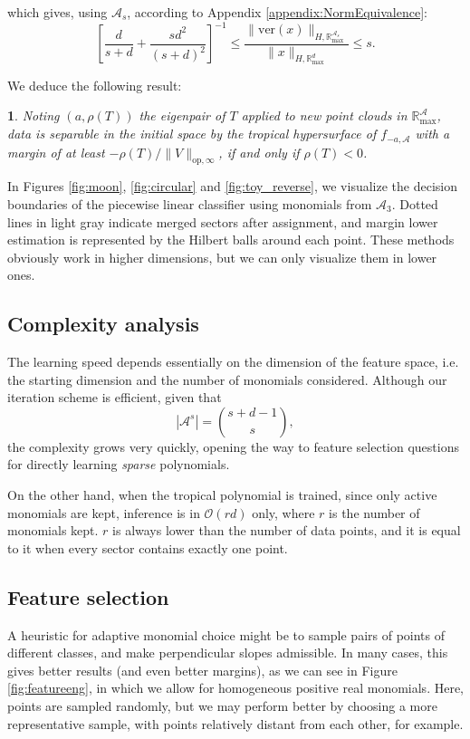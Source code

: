 \documentclass[oneside,UKenglish,a4paper]{amsart}
\numberwithin{equation}{section}
\numberwithin{figure}{section}
\theoremstyle{plain}
\theoremstyle{definition}
\theoremstyle{plain}
\newtheorem{prop}[thm]{\protect\propositionname}
\theoremstyle{remark}
\theoremstyle{plain}
\theoremstyle{definition}
\theoremstyle{definition}
\providecommand{\propositionname}{Proposition}
\begin{document}
which gives, using $\mathcal{A}_s$, according to Appendix \ref{appendix:NormEquivalence}:
\[
\left[\frac{d}{s+d}+\frac{sd^{2}}{(s+d)^{2}}\right]^{-1} \le \frac{\lVert\text{ver}(x)\rVert_{H,\mathbb{R}^{\mathcal{A}_s}_{\max}}}{\lVert x\rVert_{H,\mathbb{R}_{\max}^d}} \le s.
\]

We deduce the following result:
\begin{prop}
Noting $(a, \rho(T))$ the eigenpair of $T$ applied to new point clouds in $\mathbb{R}_{\max}^\mathcal{A}$, data is separable in the initial space by the tropical hypersurface of $f_{-a,\mathcal{A}}$ with a margin of at least $-\rho(T)/\lVert V \rVert_{\text{op},\infty}$, if and only if $\rho(T) < 0$.
\end{prop}

In Figures \ref{fig:moon}, \ref{fig:circular} and \ref{fig:toy_reverse}, we visualize the decision boundaries of the piecewise linear classifier using monomials from $\mathcal{A}_3$. Dotted lines in light gray indicate merged sectors after assignment, and margin lower estimation is represented by the Hilbert balls around each point. These methods obviously work in higher dimensions, but we can only visualize them in lower ones.

\subsection*{Complexity analysis}

The learning speed depends essentially on the dimension of the feature space, i.e. the starting dimension and the number of monomials considered. Although our iteration scheme is efficient, given that $$|\mathcal{A}^s| = \binom{s+d-1}{s},$$ the complexity grows very quickly, opening the way to feature selection questions for directly learning \emph{sparse} polynomials.

On the other hand, when the tropical polynomial is trained, since only active monomials are kept, inference is in $\mathcal{O}(rd)$ only, where $r$ is the number of monomials kept. $r$ is always lower than the number of data points, and it is equal to it when every sector contains exactly one point.

\subsection*{Feature selection}

A heuristic for adaptive monomial choice might be to sample pairs of points of different classes, and make perpendicular slopes admissible. In many cases, this gives better results (and even better margins), as we can see in Figure \ref{fig:featureeng}, in which we allow for homogeneous positive real monomials. Here, points are sampled randomly, but we may perform better by choosing a more representative sample, with points relatively distant from each other, for example.
\end{document}
